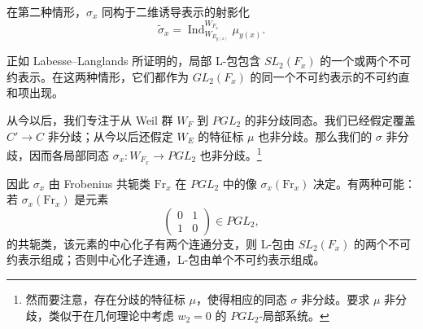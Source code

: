 在第二种情形，$\sigma_x$ 同构于二维诱导表示的射影化
\begin{equation}\tag{7.4}
\tilde\sigma_x = \operatorname{Ind}_{W_{E_{y(x)}}}^{W_{F_x}}\mu_{y(x)}.
\end{equation}

正如 Labesse--Langlands 所证明的，局部 L-包包含 $SL_2(F_x)$ 的一个或两个不可约表示。在这两种情形，它们都作为 $GL_2(F_x)$ 的同一个不可约表示的不可约直和项出现。

从今以后，我们专注于从 Weil 群 $W_F$ 到 $PGL_2$ 的非分歧同态。我们已经假定覆盖 $C'\to C$ 非分歧；从今以后还假定 $W_E$ 的特征标 $\mu$ 也非分歧。那么我们的 $\sigma$ 非分歧，因而各局部同态 $\sigma_x: W_{F_x}\to PGL_2$ 也非分歧。\footnote{然而要注意，存在分歧的特征标 $\mu$，使得相应的同态 $\sigma$ 非分歧。要求 $\mu$ 非分歧，类似于在几何理论中考虑 $w_2=0$ 的 $PGL_2$-局部系统。}


因此 $\sigma_x$ 由 Frobenius 共轭类 $\mathrm{Fr}_x$ 在 $PGL_2$ 中的像 $\sigma_x(\mathrm{Fr}_x)$ 决定。有两种可能：若 $\sigma_x(\mathrm{Fr}_x)$ 是元素
\begin{equation}\tag{7.5}
\begin{pmatrix}0&1\\ 1&0\end{pmatrix}\in PGL_2,
\end{equation}
的共轭类，该元素的中心化子有两个连通分支，则 L-包由 $SL_2(F_x)$ 的两个不可约表示组成；否则中心化子连通，L-包由单个不可约表示组成。

